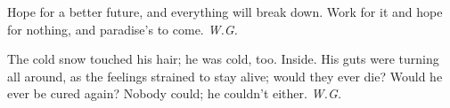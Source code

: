 Hope for a better future, 
and everything will break down. 
Work for it and hope for nothing, 
and paradise's to come. 
\emph{W.G.}

The cold snow touched his hair;
he was cold, too. 
Inside. 
His guts were turning all around,
as the feelings strained to stay alive;
would they ever die?
Would he ever be cured again?
Nobody could;
he couldn't either. 
\emph{W.G.}

